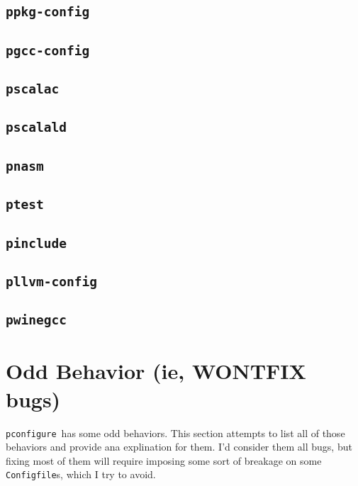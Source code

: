 \documentclass{article}
\newcommand{\pconfigure}{\texttt{pconfigure}}
\begin{document}
\subsection{\texttt{ppkg-config}}

\subsection{\texttt{pgcc-config}}

\subsection{\texttt{pscalac}}

\subsection{\texttt{pscalald}}

\subsection{\texttt{pnasm}}

\subsection{\texttt{ptest}}

\subsection{\texttt{pinclude}}

\subsection{\texttt{pllvm-config}}

\subsection{\texttt{pwinegcc}}

\section{Odd Behavior (ie, WONTFIX bugs) \label{odd}}

\pconfigure\ has some odd behaviors.  This section attempts to list
all of those behaviors and provide ana explination for them.  I'd
consider them all bugs, but fixing most of them will require imposing
some sort of breakage on some \texttt{Configfile}s, which I try to
avoid.
\end{document}

